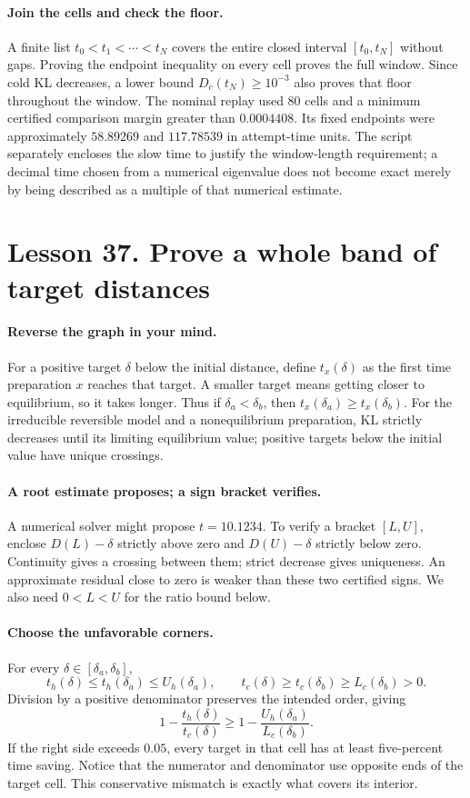 \paragraph{Join the cells and check the floor.}
A finite list $t_0<t_1<\cdots<t_N$ covers the entire closed interval
$[t_0,t_N]$ without gaps. Proving the endpoint inequality on every cell
proves the full window. Since cold KL decreases, a lower bound
$D_c(t_N)\geq10^{-3}$ also proves that floor throughout the window.
The nominal replay used 80 cells and a minimum certified comparison margin
greater than $0.0004408$. Its fixed endpoints were approximately
$58.89269$ and $117.78539$ in attempt-time units. The script separately
encloses the slow time to justify the window-length requirement; a decimal
time chosen from a numerical eigenvalue does not become exact merely by
being described as a multiple of that numerical estimate.

\section*{Lesson 37. Prove a whole band of target distances}
\paragraph{Reverse the graph in your mind.}
For a positive target $\delta$ below the initial distance, define
$t_x(\delta)$ as the first time preparation $x$ reaches that target.
A smaller target means getting closer to equilibrium, so it takes longer.
Thus if $\delta_a<\delta_b$, then $t_x(\delta_a)\geq t_x(\delta_b)$.
For the irreducible reversible model and a nonequilibrium preparation,
KL strictly decreases until its limiting equilibrium value; positive targets
below the initial value have unique crossings.

\paragraph{A root estimate proposes; a sign bracket verifies.}
A numerical solver might propose $t=10.1234$. To verify a bracket $[L,U]$,
enclose $D(L)-\delta$ strictly above zero and $D(U)-\delta$ strictly below
zero. Continuity gives a crossing between them; strict decrease gives
uniqueness. An approximate residual close to zero is weaker than these
two certified signs. We also need $0<L<U$ for the ratio bound below.

\paragraph{Choose the unfavorable corners.}
For every $\delta\in[\delta_a,\delta_b]$,
\[
 t_h(\delta)\leq t_h(\delta_a)\leq U_h(\delta_a),\qquad
 t_c(\delta)\geq t_c(\delta_b)\geq L_c(\delta_b)>0.
\]
Division by a positive denominator preserves the intended order, giving
\[
 1-\frac{t_h(\delta)}{t_c(\delta)}
 \geq 1-\frac{U_h(\delta_a)}{L_c(\delta_b)}.
\]
If the right side exceeds $0.05$, every target in that cell has at least
five-percent time saving. Notice that the numerator and denominator use
opposite ends of the target cell. This conservative mismatch is exactly
what covers its interior.


